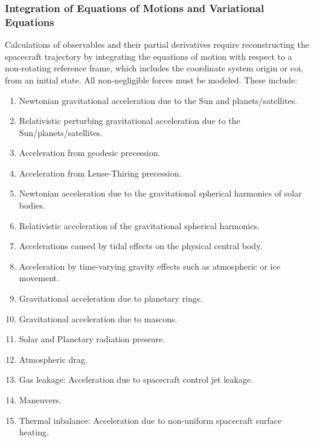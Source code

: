 \documentclass{article}
\begin{document}
                \subsubsection{%
                    \footnotesize{%
                        Integration of Equations of Motions
                        and Variational Equations
                    }
                }
                    Calculations of observables and their partial
                    derivatives require reconstructing the
                    spacecraft trajectory by integrating the
                    \gls{equations of motion} with respect to
                    a non-rotating reference frame, which includes
                    the coordinate system origin or \gls{coi},
                    from an initial state. All non-negligible
                    forces must be modeled. These include:
                    \begin{enumerate}
                        \item Newtonian gravitational acceleration
                              due to the Sun and planets/satellites.
                        \item Relativistic perturbing gravitational
                              acceleration due to the
                              Sun/planets/satellites.
                        \item Acceleration from geodesic precession.
                        \item Acceleration from Lense-Thiring
                              precession.
                        \item Newtonian acceleration due to the
                              gravitational spherical harmonics of
                              solar bodies.
                        \item Relativistic acceleration of the
                              gravitational spherical harmonics.
                        \item Accelerations caused by tidal effects
                              on the physical central body.
                        \item Acceleration by time-varying gravity
                              effects such as atmospheric
                              or ice movement.
                        \item Gravitational acceleration due to
                              planetary rings.
                        \item Gravitational acceleration
                              due to mascons.
                        \item Solar and Planetary radiation pressure.
                        \item Atmospheric drag.
                        \item Gas leakage: Acceleration
                              due to spacecraft control jet leakage.
                        \item Maneuvers.
                        \item Thermal inbalance: Acceleration
                              due to non-uniform spacecraft
                              surface heating.
                    \end{enumerate}
\end{document}
